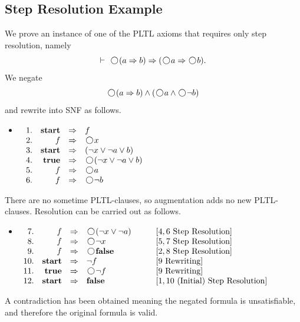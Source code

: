 \documentclass[nohyperref]{acmtrans2f}
\newcommand{\next}{\!\raisebox{-.2ex}{ %
                        \mbox{\unitlength=0.9ex
                        \begin{picture}(2,2)
                        \linethickness{0.06ex}
                        \put(1,1){\circle{2}} %
                        \end{picture}}}       %
                        \,}
\let\imp=\Rightarrow
\def\ltrue{\hbox{\rm\bf true}}
\def\lfalse{\hbox{\rm\bf false}}
\def\lstart{\hbox{\rm\bf start}}
\begin{document}
\subsection{Step Resolution Example}
We prove an instance of one of the PLTL axioms that requires only step
resolution, namely 
$$
\vdash\ \next (a \imp b) \imp (  \next a \imp \next b).
$$
We negate
$$
\next (a \imp b) \land (\next a \land \next \neg b)
$$
and rewrite into SNF as follows.
\begin{itemize}
\item[] $\begin{array}[t]{rrcl}
1. & \lstart & \imp & f \\
2. & f & \imp & \next x \\
3. & \lstart & \imp &  (\neg x \lor \neg a \lor b) \\
4. & \ltrue & \imp & \next (\neg x \lor \neg a \lor b) \\
5. & f & \imp & \next a \\
~6. & f & \imp & \next \neg b 
\end{array}$
\end{itemize}
There are no sometime PLTL-clauses, so augmentation adds no new PLTL-clauses.
Resolution can be carried out as follows.
\begin{itemize}
\item[] $\begin{array}[t]{rrcll}
7. & f & \imp & \next (\neg x \lor \neg a)\qquad & [4,6 \mbox{ Step Resolution}] \\
8. & f  & \imp & \next \neg x  & [5,7 \mbox{ Step Resolution}] \\
9. & f  & \imp & \next \lfalse & [2,8 \mbox{ Step Resolution}] \\
10. & \lstart  & \imp & \neg f & [9 \mbox{ Rewriting}] \\
11. & \ltrue  & \imp & \next \neg f & [9 \mbox{ Rewriting}] \\
12. & \lstart  & \imp & \lfalse & [1,10 \mbox{ (Initial) Step Resolution}]
\end{array}$
\end{itemize}
%
A contradiction has been obtained meaning the negated formula is
unsatisfiable, and therefore the original formula is valid.
%
\end{document}
